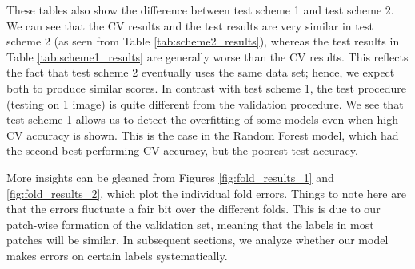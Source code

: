 \documentclass[11pt, letterpaper, journal]{IEEEtran}
\begin{document}
These tables also show the difference between test scheme 1 and test scheme 2. We can see that the CV results and the test results are very similar in test scheme 2 (as seen from Table \ref{tab:scheme2_results}), whereas the test results in Table \ref{tab:scheme1_results} are generally worse than the CV results. This reflects the fact that test scheme 2 eventually uses the same data set; hence, we expect both to produce similar scores. In contrast with test scheme 1, the test procedure (testing on 1 image) is quite different from the validation procedure. We see that test scheme 1 allows us to detect the overfitting of some models even when high CV accuracy is shown. This is the case in the Random Forest model, which had the second-best performing CV accuracy, but the poorest test accuracy.

More insights can be gleaned from Figures \ref{fig:fold_results_1} and \ref{fig:fold_results_2}, which plot the individual fold errors. Things to note here are that the errors fluctuate a fair bit over the different folds. This is due to our patch-wise formation of the validation set, meaning that the labels in most patches will be similar. In subsequent sections, we analyze whether our model makes errors on certain labels systematically. 

\begin{table}
\begin{center}
\caption{CV and test results for the 4 models under test scheme 1. "B.Acc" stands for balanced accuracy.}
\label{tab:scheme1_results}
\end{center}
\end{table}
\end{document}
